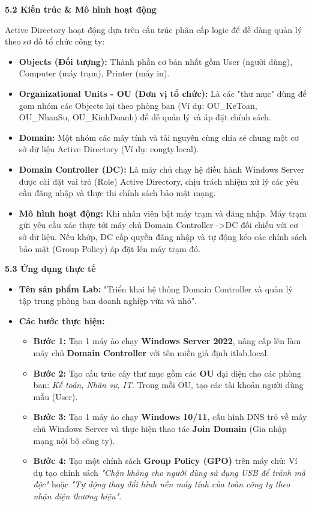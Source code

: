 \documentclass[
]{article}
\begin{document}
\textbf{5.2 Kiến trúc \& Mô hình hoạt động}

Active Directory hoạt động dựa trên cấu trúc phân cấp logic để dễ dàng
quản lý theo sơ đồ tổ chức công ty:

\begin{itemize}
\item
  \textbf{Objects (Đối tượng):} Thành phần cơ bản nhất gồm User (người
  dùng), Computer (máy trạm), Printer (máy in).
\item
  \textbf{Organizational Units - OU (Đơn vị tổ chức):} Là các "thư mục"
  dùng để gom nhóm các Objects lại theo phòng ban (Ví dụ: OU\_KeToan,
  OU\_NhanSu, OU\_KinhDoanh) để dễ quản lý và áp đặt chính sách.
\item
  \textbf{Domain:} Một nhóm các máy tính và tài nguyên cùng chia sẻ
  chung một cơ sở dữ liệu Active Directory (Ví dụ: congty.local).
\item
  \textbf{Domain Controller (DC):} Là máy chủ chạy hệ điều hành Windows
  Server được cài đặt vai trò (Role) Active Directory, chịu trách nhiệm
  xử lý các yêu cầu đăng nhập và thực thi chính sách bảo mật mạng.
\item
  \textbf{Mô hình hoạt động:} Khi nhân viên bật máy trạm và đăng nhập.
  Máy trạm gửi yêu cầu xác thực tới máy chủ Domain Controller
  -\textgreater DC đối chiếu với cơ sở dữ liệu. Nếu khớp, DC cấp quyền
  đăng nhập và tự động kéo các chính sách bảo mật (Group Policy) áp đặt
  lên máy trạm đó.
\end{itemize}

\textbf{5.3 Ứng dụng thực tế}

\begin{itemize}
\item
  \textbf{Tên sản phẩm Lab:} "Triển khai hệ thống Domain Controller và
  quản lý tập trung phòng ban doanh nghiệp vừa và nhỏ".
\item
  \textbf{Các bước thực hiện:}

  \begin{itemize}
  \item
    \textbf{Bước 1:} Tạo 1 máy ảo chạy \textbf{Windows Server 2022},
    nâng cấp lên làm máy chủ \textbf{Domain Controller} với tên miền giả
    định itlab.local.
  \item
    \textbf{Bước 2:} Tạo cấu trúc cây thư mục gồm các \textbf{OU} đại
    diện cho các phòng ban: \emph{Kế toán, Nhân sự, IT}. Trong mỗi OU,
    tạo các tài khoản người dùng mẫu (User).
  \item
    \textbf{Bước 3:} Tạo 1 máy ảo chạy \textbf{Windows 10/11}, cấu hình
    DNS trỏ về máy chủ Windows Server và thực hiện thao tác \textbf{Join
    Domain} (Gia nhập mạng nội bộ công ty).
  \item
    \textbf{Bước 4:} Tạo một chính sách \textbf{Group Policy (GPO)} trên
    máy chủ: Ví dụ tạo chính sách \emph{"Chặn không cho người dùng sử
    dụng USB để tránh mã độc"} hoặc \emph{"Tự động thay đổi hình nền máy
    tính của toàn công ty theo nhận diện thương hiệu"}.
  \end{itemize}
\end{itemize}
\end{document}
